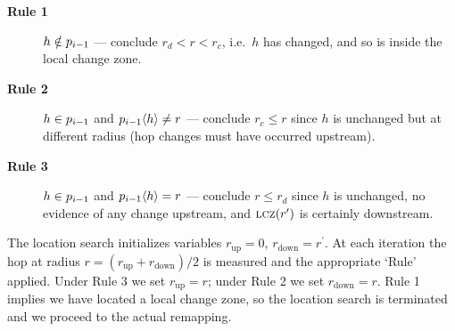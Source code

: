 
\begin{description}
%
\item[\hspace{-1em}\textbf{Rule 1}] $h \notin p_{i-1}$ --- conclude $r_d <
r < r_c$, i.e.~$h$ has changed, and so is inside the local change zone.
%
\item[\hspace{-1em}\textbf{Rule 2}] $h \in p_{i-1}$ and $p_{i-1}\langle
h\rangle \ne r$ --- conclude $r_c \le r$ since $h$ is unchanged but at
different radius (hop changes must have occurred upstream).
%
\item[\hspace{-1em}\textbf{Rule 3}] $h\in p_{i-1}$ and $p_{i-1}\langle
h\rangle = r$ --- conclude $r \le r_d$ since $h$ is unchanged, no
evidence of any change upstream, and $\mathrm{\textsc{lcz}}(r')$ is certainly downstream.
%
\end{description}

The location search initializes variables $r_\mathrm{up} = 0$,
$r_\mathrm{down} = r^\prime$.  At each iteration the hop at radius $r =
(r_\mathrm{up} + r_\mathrm{down})/2$ is measured and the appropriate
`Rule' applied.  Under Rule 3 we set $r_\mathrm{up} = r$; under Rule 2
we set $r_\mathrm{down} = r$.  Rule 1 implies we have located a local
change zone, so the location search is terminated and we proceed to the
actual remapping.








